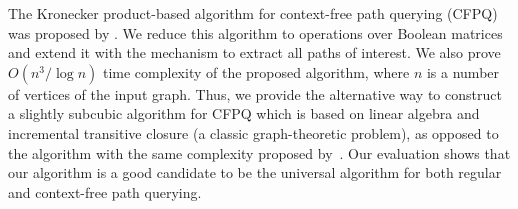

The Kronecker product-based algorithm for context-free path querying (CFPQ) was proposed by \cite{10.1007/978-3-030-54832-2_6}. We reduce this algorithm to operations over Boolean matrices and extend it with the mechanism to extract all paths of interest. We also prove $O(n^3/\log{n})$ time complexity of the proposed algorithm, where $n$ is a number of vertices of the input graph. Thus, we provide the alternative way to construct a slightly subcubic algorithm for CFPQ which is based on linear algebra and incremental transitive closure (a classic graph-theoretic problem), as opposed to the algorithm with the same complexity proposed by~\cite{10.1145/1328438.1328460}. Our evaluation shows that our algorithm is a good candidate to be the universal algorithm for both regular and context-free path querying.